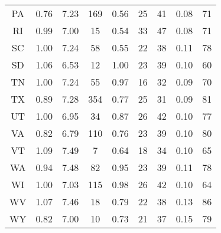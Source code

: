 \begin{table}
\begin{tabular}{ccccccccc}
   PA &    0.76 &  7.23 &   169 &     0.56 &      25 &        41 &   0.08 &        71 \\
   RI &    0.99 &  7.00 &    15 &     0.54 &      33 &        47 &   0.08 &        71 \\
   SC &    1.00 &  7.24 &    58 &     0.55 &      22 &        38 &   0.11 &        78 \\
   SD &    1.06 &  6.53 &    12 &     1.00 &      23 &        39 &   0.10 &        60 \\
   TN &    1.00 &  7.24 &    55 &     0.97 &      16 &        32 &   0.09 &        70 \\
   TX &    0.89 &  7.28 &   354 &     0.77 &      25 &        31 &   0.09 &        81 \\
   UT &    1.00 &  6.95 &    34 &     0.87 &      26 &        42 &   0.10 &        77 \\
   VA &    0.82 &  6.79 &   110 &     0.76 &      23 &        39 &   0.10 &        80 \\
   VT &    1.09 &  7.49 &     7 &     0.64 &      18 &        34 &   0.10 &        65 \\
   WA &    0.94 &  7.48 &    82 &     0.95 &      23 &        39 &   0.11 &        78 \\
   WI &    1.00 &  7.03 &   115 &     0.98 &      26 &        42 &   0.10 &        64 \\
   WV &    1.07 &  7.46 &    18 &     0.79 &      22 &        38 &   0.13 &        86 \\
   WY &    0.82 &  7.00 &    10 &     0.73 &      21 &        37 &   0.15 &        79 \\
\bottomrule
\end{tabular}
\end{table}
